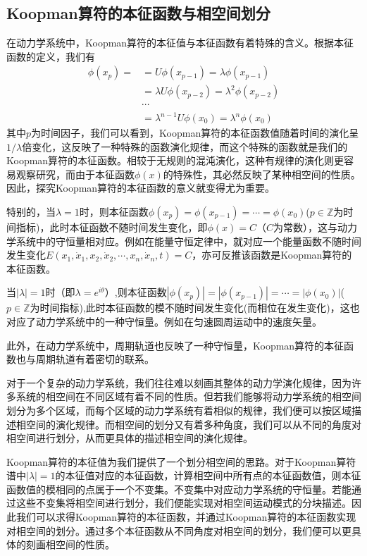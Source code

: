 \subsection{Koopman算符的本征函数与相空间划分}

在动力学系统中，Koopman算符的本征值与本征函数有着特殊的含义。根据本征函数的定义，我们有
\begin{equation}
    \begin{aligned}
        \phi(x_p)=  &=U\phi(x_{p-1})=\lambda\phi(x_{p-1})\\
                    &=\lambda U\phi(x_{p-2})=\lambda^2\phi(x_{p-2})\\
                    &\cdots\\
                    &=\lambda^{n-1}U\phi(x_0)=\lambda^n\phi(x_0)
    \end{aligned}
\end{equation}
其中$p$为时间因子，我们可以看到，Koopman算符的本征函数值随着时间的演化呈$1/\lambda$倍变化，这反映了一种特殊的函数演化规律，而这个特殊的函数就是我们的Koopman算符的本征函数。相较于无规则的混沌演化，这种有规律的演化则更容易观察研究，而由于本征函数$\phi(x)$的特殊性，其必然反映了某种相空间的性质。因此，探究Koopman算符的本征函数的意义就变得尤为重要。

特别的，当$\lambda=1$时，则本征函数$\phi(x_p)=\phi(x_{p-1})=\cdots=\phi(x_{0})$($p\in \mathbb{Z}$为时间指标)，此时本征函数不随时间发生变化，即$\phi(x)=C$（$C$为常数），这与动力学系统中的守恒量相对应。例如在能量守恒定律中，就对应一个能量函数不随时间发生变化$E(x_1,\dot{x}_1,x_2,\dot{x}_2,\cdots,x_n,\dot{x}_n,t)=C$，亦可反推该函数是Koopman算符的本征函数。

当$|\lambda|=1$时（即$\lambda=e^{i\theta}$）,则本征函数$|\phi(x_p)|=|\phi(x_{p-1})|=\cdots=|\phi(x_{0})|$($p\in \mathbb{Z}$为时间指标),此时本征函数的模不随时间发生变化(而相位在发生变化)，这也对应了动力学系统中的一种守恒量。例如在匀速圆周运动中的速度矢量。

此外，在动力学系统中，周期轨道也反映了一种守恒量，Koopman算符的本征函数也与周期轨道有着密切的联系。

对于一个复杂的动力学系统，我们往往难以刻画其整体的动力学演化规律，因为许多系统的相空间在不同区域有着不同的性质。但若我们能够将动力学系统的相空间划分为多个区域，而每个区域的动力学系统有着相似的规律，我们便可以按区域描述相空间的演化规律。而相空间的划分又有着多种角度，我们可以从不同的角度对相空间进行划分，从而更具体的描述相空间的演化规律。

Koopman算符的本征值为我们提供了一个划分相空间的思路。对于Koopman算符谱中$|\lambda|=1$的本征值对应的本征函数，计算相空间中所有点的本征函数值，则本征函数值的模相同的点属于一个不变集\cite{brunton2016koopman}。不变集中对应动力学系统的守恒量。若能通过这些不变集将相空间进行划分，我们便能实现对相空间运动模式的分块描述。因此我们可以求得Koopman算符的本征函数，并通过Koopman算符的本征函数实现对相空间的划分。通过多个本征函数从不同角度对相空间的划分，我们便可以更具体的刻画相空间的性质。



